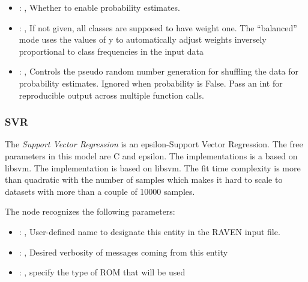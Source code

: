 \begin{itemize}
    \item {}: ,
      Whether to enable probability estimates.

    \item {}: \xmlDesc{[balanced]},
      If not given, all classes are supposed to have weight one.
      The “balanced” mode uses the values of y to automatically adjust weights
      inversely proportional to class frequencies in the input data

    \item {}: ,
      Controls the pseudo random number generation for shuffling
      the data for probability estimates. Ignored when probability is False.
      Pass an int for reproducible output across multiple function calls.
  \end{itemize}


\subsubsection{SVR}
  The  \textit{Support Vector Regression} is an epsilon-Support Vector Regression.
  The free parameters in this model are C and epsilon. The implementations is a based on libsvm.
  The implementation is based on libsvm. The fit time complexity                             is more
  than quadratic with the number of samples which makes it hard                             to scale
  to datasets with more than a couple of 10000 samples.

  The  node recognizes the following parameters:
    \begin{itemize}
      \item {}: ,
        User-defined name to designate this entity in the RAVEN input file.
      \item {}: ,
        Desired verbosity of messages coming from this entity
      \item {}: ,
        specify the type of ROM that will be used
  \end{itemize}

